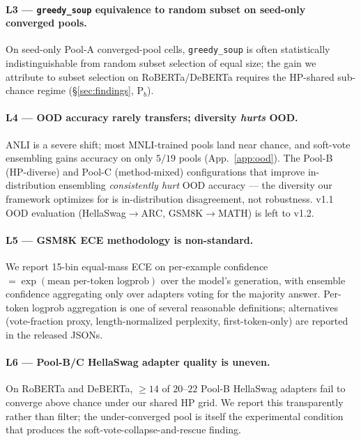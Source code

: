 \documentclass[11pt]{article}
\begin{document}
\paragraph{L3 — \texttt{greedy\_soup} equivalence to random subset on seed-only converged pools.} On seed-only Pool-A converged-pool cells, \texttt{greedy\_soup} is often statistically indistinguishable from random subset selection of equal size; the gain we attribute to subset selection on RoBERTa/DeBERTa requires the HP-shared sub-chance regime (\S\ref{sec:findings}, P$_b$).

\paragraph{L4 — OOD accuracy rarely transfers; diversity \emph{hurts} OOD.} ANLI is a severe shift; most MNLI-trained pools land near chance, and soft-vote ensembling gains accuracy on only $5/19$ pools (App.~\ref{app:ood}). The Pool-B (HP-diverse) and Pool-C (method-mixed) configurations that improve in-distribution ensembling \emph{consistently hurt} OOD accuracy --- the diversity our framework optimizes for is in-distribution disagreement, not robustness. v1.1 OOD evaluation (HellaSwag$\to$ARC, GSM8K$\to$MATH) is left to v1.2.

\paragraph{L5 — GSM8K ECE methodology is non-standard.} We report 15-bin equal-mass ECE on per-example confidence $=\!\exp(\text{mean per-token logprob})$ over the model's generation, with ensemble confidence aggregating only over adapters voting for the majority answer. Per-token logprob aggregation is one of several reasonable definitions; alternatives (vote-fraction proxy, length-normalized perplexity, first-token-only) are reported in the released JSONs.

\paragraph{L6 — Pool-B/C HellaSwag adapter quality is uneven.} On RoBERTa and DeBERTa, $\geq 14$ of $20$--$22$ Pool-B HellaSwag adapters fail to converge above chance under our shared HP grid. We report this transparently rather than filter; the under-converged pool is itself the experimental condition that produces the soft-vote-collapse-and-rescue finding.
\end{document}
